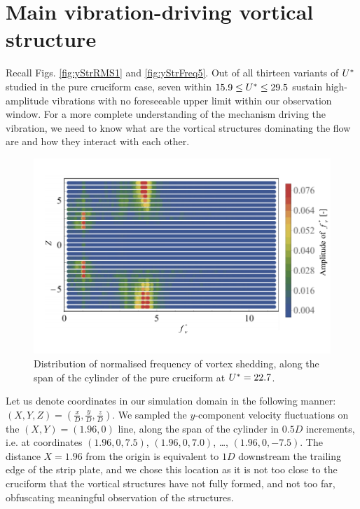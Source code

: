 \documentclass[oneside]{utmthesis}
\begin{document}
\section{Main vibration-driving vortical structure}\label{sec:svivRegimeVortStruct}
Recall Figs. \ref{fig:yStrRMS1} and \ref{fig:yStrFreq5}. Out of all thirteen variants of $U^{*}$ studied in the pure cruciform case, seven within $15.9 \leq U^{*} \leq 29.5$ sustain high-amplitude vibrations with no foreseeable upper limit within our observation window. For a more complete understanding of the mechanism driving the vibration, we need to know what are the vortical structures dominating the flow are and how they interact with each other.

\begin{figure}
  \centering
\includegraphics[width=1\textwidth]{figs/probe90YU10}
\caption{Distribution of normalised frequency of vortex shedding, along the span of the cylinder of the pure cruciform at $U^{*} = 22.7$.}
  \label{fig:probe90YU10}
\end{figure}

Let us denote coordinates in our simulation domain in the following manner: $\left( X, Y, Z \right) = \left( \frac{x}{D}, \frac{y}{D}, \frac{z}{D} \right)$. We sampled the $y$-component velocity fluctuations on the $\left ( X, Y \right ) = \left ( 1.96, 0 \right )$ line, along the span of the cylinder in $0.5D$ increments, i.e. at coordinates $\left ( 1.96, 0, 7.5 \right )$, $\left ( 1.96, 0, 7.0 \right )$, \dots, $\left ( 1.96, 0, -7.5 \right )$. The distance $X = 1.96$ from the origin is equivalent to $1D$ downstream the trailing edge of the strip plate, and we chose this location as it is not too close to the cruciform that the vortical structures have not fully formed, and not too far, obfuscating meaningful observation of the structures.
\end{document}
